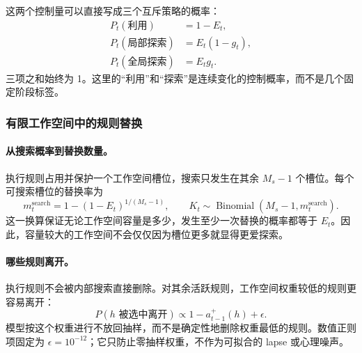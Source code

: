 这两个控制量可以直接写成三个互斥策略的概率：
\begin{align}
P_t(\text{利用})&=1-E_t,
\nonumber\\
P_t(\text{局部探索})&=E_t(1-g_t),
\nonumber\\
P_t(\text{全局探索})&=E_tg_t.
\label{eq:dynamic-strategy-decomposition}
\end{align}
三项之和始终为 1。这里的“利用”和“探索”是连续变化的控制概率，而不是几个固定阶段标签。


\subsubsection{有限工作空间中的规则替换}

\paragraph{从搜索概率到替换数量。}
执行规则占用并保护一个工作空间槽位，搜索只发生在其余 $M_s-1$ 个槽位。每个可搜索槽位的替换率为
\begin{equation}
m_t^{\mathrm{search}}
=1-(1-E_t)^{1/(M_s-1)},
\qquad
K_t\sim\operatorname{Binomial}(M_s-1,m_t^{\mathrm{search}}).
\label{eq:dynamic-protected-search}
\end{equation}
这一换算保证无论工作空间容量是多少，发生至少一次替换的概率都等于 $E_t$。因此，容量较大的工作空间不会仅仅因为槽位更多就显得更爱探索。

\paragraph{哪些规则离开。}
执行规则不会被内部搜索直接删除。对其余活跃规则，工作空间权重较低的规则更容易离开：
\begin{equation}
P(h\text{ 被选中离开})
\propto 1-a_{t-1}^{+}(h)+\epsilon.
\label{eq:dynamic-drop-rule}
\end{equation}
模型按这个权重进行不放回抽样，而不是确定性地删除权重最低的规则。数值正则项固定为 $\epsilon=10^{-12}$；它只防止零抽样权重，不作为可拟合的 lapse 或心理噪声。

